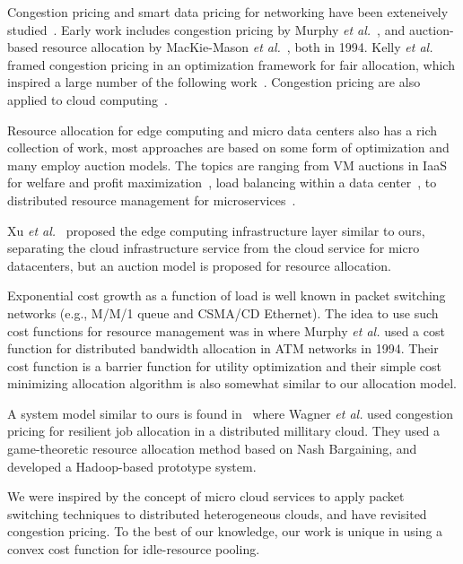 Congestion pricing and smart data pricing for networking have been
exteneively studied~\cite{Sen-2013}.
Early work includes congestion pricing by
Murphy {\em et al.}~\cite{Murphy94distributedpricing},
and auction-based resource allocation by
MacKie-Mason {\em et al.}~\cite{pricing-internet-1994}, both in 1994.
Kelly {\em et al.}~\cite{Kelly-1998} framed congestion pricing in an
optimization framework for fair allocation, which inspired a large
number of the following
work~\cite{Sen-2013,gibbens1999resource,Henderson2001,Briscoe2003-M3I}.
Congestion pricing are also applied to cloud
computing~\cite{Wang-hotcloud2010,Song-2014,Kilcioglu-SIGMETRICS2015,Song-INFOCOM2017}.

Resource allocation for edge computing and micro data centers also has
a rich collection of work, most approaches are based on some form of
optimization and many employ auction models.
The topics are ranging from VM auctions in IaaS for welfare and profit
maximization~\cite{Xu2017-zenith,Zhang2017-VMauction},
load balancing within a data center~\cite{Rikhtegar2021BiTEAD,Chen-SOCC-2014},
to
distributed resource management for microservices~\cite{Suresh-SOA-SOCC2017}.

Xu {\em et al.}~\cite{Xu2017-zenith} proposed the edge computing
infrastructure layer similar to ours, separating the cloud
infrastructure service from the cloud service for micro datacenters,
but an auction model is proposed for resource allocation.

Exponential cost growth as a function of load is well known in packet
switching networks (e.g., M/M/1 queue and CSMA/CD Ethernet).
The idea to use such cost functions for resource management
was in \cite{Murphy94distributedpricing} where
Murphy {\em et al.} used a cost function for distributed bandwidth
allocation in ATM networks in 1994.
Their cost function is a barrier function for utility optimization
and their simple cost minimizing allocation algorithm is also somewhat
similar to our allocation model.

A system model similar to ours is found in~\cite{Wagner-2012} where
Wagner {\em et al.} used congestion pricing for resilient job
allocation in a distributed millitary cloud.  They used a
game-theoretic resource allocation method based on Nash Bargaining,
and developed a Hadoop-based prototype system.

We were inspired by the concept of micro cloud services to apply packet
switching techniques to distributed heterogeneous clouds, and have
revisited congestion pricing.
To the best of our knowledge, our work is unique in using a convex
cost function for idle-resource pooling.



